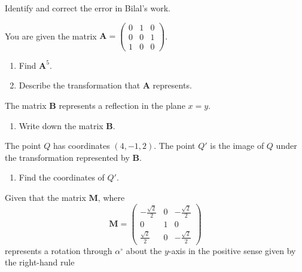 \documentclass[leqno]{article}
\begin{document}
\begin{enumerate}[
  label=\textbf{\arabic*.},
  leftmargin=*,
  topsep=0pt,
  partopsep=0pt,
  parsep=0pt
]
Identify and correct the error in Bilal's work. 

\newpage

\questionitem

You are given the matrix $\mathbf{A} = \begin{pmatrix}0 & 1 & 0\\0 & 0 & 1\\1 & 0 & 0\end{pmatrix}$. \\

\begin{enumerate}[label=\textbf{(\alph*)}]
  \item Find $\mathbf{A}^5$.  \\
  \item Describe the transformation that $\mathbf{A}$ represents.  \\
\end{enumerate}

The matrix $\mathbf{B}$ represents a reflection in the plane $x = y$. \\

\begin{enumerate}[label=\textbf{(\alph*)}, resume]
  \item Write down the matrix $\mathbf{B}$.  \\
\end{enumerate}

The point $Q$ has coordinates $(4, -1, 2)$. The point $Q'$ is the image of $Q$ under the transformation represented by $\mathbf{B}$. \\

\begin{enumerate}[label=\textbf{(\alph*)}, resume]
  \item Find the coordinates of $Q'$.  \\
\end{enumerate}

\newpage

\questionitem

Given that the matrix $\mathbf{M}$, where
\[
\mathbf{M} = \begin{pmatrix}
-\frac{\sqrt{2}}{2} & 0 & -\frac{\sqrt{2}}{2} \\
0 & 1 & 0 \\
\frac{\sqrt{2}}{2} & 0 & -\frac{\sqrt{2}}{2}
\end{pmatrix}
\]
represents a rotation through $\alpha^\circ$ about the $y$-axis in the positive sense given by the right-hand rule \\


\end{enumerate}
\end{document}
